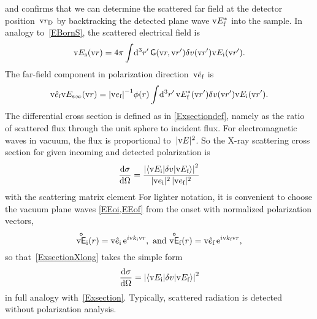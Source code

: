 and confirms that we can determine the scattered far field at the detector position~$\text{v}{r}_\text{D}$
%
by backtracking the detected plane wave $\text{v}{E}_{\text{f}}^*$ into the sample.
In analogy to~\cref{EBornS}, the scattered electrical field is
%
%
\begin{equation}\label{EBornX}
  \text{v}{E}_{\text{s}}(\text{v}{r})
  = 4\pi\int\!\mathrm d^3r'\, \mathsf{G}(\text{v}{r},\text{v}{r}')\delta v(\text{v}{r}')\text{v}{E}_{\text{i}}(\text{v}{r}').
\end{equation}
The far-field component in polarization direction~$\text{v}{\hat e}_{\text{f}}$ is
\begin{equation}
  \text{v}{\hat e}_{\text{f}}\text{v}{E}_{\text{s}\infty}(\text{v}{r})
  = {|\text{v}{e}_{\text{f}}|}^{-1}\phi(r) \int\!\mathrm d^3r'\, \text{v}{E}_{\text{f}}^*(\text{v}{r}')\delta v(\text{v}{r}')\text{v}{E}_{\text{i}}(\text{v}{r}').
\end{equation}
The differential cross section
is defined as in \cref{Exsectiondef},
namely as the ratio of scattered flux through the unit sphere to incident flux.
%
%
%
For electromagnetic waves in vacuum, the flux is proportional to~$|\text{v}{E}|^2$.
So the X-ray scattering cross section for given incoming and detected polarization is
\begin{equation}\label{ExsectionXlong}
  \frac{\mathrm d\sigma}{\mathrm d\Omega}
  =  \frac{ {\left|\left\langle\text{v}{E}_{\text{i}}|\delta v|\text{v}{E}_{\text{f}}\right\rangle\right|}^2 }{|\text{v}{e}_{\text{i}}|^2\,|\text{v}{e}_{\text{f}}|^2}
\end{equation}
with the scattering matrix element
%
For lighter notation,
it is convenient to choose the vacuum plane waves \cref{EEoi,EEof} from the onset
with normalized polarization vectors,
\begin{equation}\label{EbcE}
  \mathsf{\overset{o}{\text{v}{E}}}_{\text{i}}(r) = \text{v}{\hat e}_{\text{i}}\, \mathrm e^{i\text{v}{k}_{\text{i}}\text{v}{r}}, \text{~and~}
  \mathsf{\overset{o}{\text{v}{E}}}_{\text{f}}(r) = \text{v}{\hat e}_{\text{f}}\, \mathrm e^{i\text{v}{k}_{\text{f}}\text{v}{r}},
\end{equation}
so that~\cref{ExsectionXlong}
takes the simple form
\begin{equation}\label{ExsectionX}
  \frac{\mathrm d\sigma}{\mathrm d\Omega}
  =  {\left|\left\langle\text{v}{E}_{\text{i}}|\delta v|\text{v}{E}_{\text{f}}\right\rangle\right|}^2
\end{equation}
in full analogy with~\cref{Exsection}.
Typically, scattered radiation is detected without polarization analysis.
%
%
